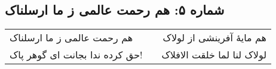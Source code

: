 \begin{center}
\section*{شماره ۵: هم رحمت عالمی ز ما ارسلناک}
\label{sec:005}
\begin{longtable}{l p{0.5cm} r}
هم رحمت عالمی ز ما ارسلناک
&&
هم مایهٔ آفرینشی از لولاک
\\
حق کرده ندا بجانت ای گوهر پاک!
&&
لولاک لنا لما خلقت الافلاک
\\
\end{longtable}
\end{center}
